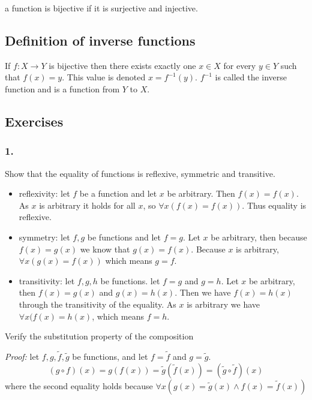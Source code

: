 a function is bijective if it is surjective and injective.

\subsection{Definition of inverse functions}

If $f:X\rightarrow Y$ is bijective then there exists exactly one $x\in X$ for every $y\in Y$ such that $f(x) = y$. This value is denoted $x = f^{-1}(y)$. $f^{-1}$ is called the inverse function and is a function from $Y$ to $X$.


\subsection{Exercises}

\subsubsection*{1.} Show that the equality of functions is reflexive, symmetric and transitive.
\begin{itemize}
	\item reflexivity: let $f$ be a function and let $x$ be arbitrary. Then $f(x) = f(x)$. As $x$ is arbitrary it holds for all $x$, so $\forall x (f(x) = f(x))$. Thus equality is reflexive.
	\item symmetry: let $f,g$ be functions and let $f=g$. Let $x$ be arbitrary, then because $f(x) = g(x)$ we know that $g(x)=f(x)$. Because $x$ is arbitrary, $\forall x(g(x) = f(x))$ which means $g=f$.
	\item transitivity: let $f,g,h$ be functions. let $f=g$ and $g=h$. Let $x$ be arbitrary, then $f(x) = g(x)$ and $g(x) = h(x)$. Then we have $f(x) = h(x)$ through the transitivity of the equality. As $x$ is arbitrary we have $\forall x(f(x) = h(x)$, which means $f=h$.
\end{itemize}
Verify the substitution property of the composition

\textit{Proof: } let $f,g,\tilde f,\tilde g$ be functions, and let $f=\tilde f$ and $g=\tilde g$.
$$
(g\circ f)(x) = g(f(x)) = \tilde g(\tilde f(x)) = (\tilde g\circ\tilde f)(x)
$$
where the second equality holds because $\forall x (g(x)=\tilde g(x) \wedge f(x)=\tilde f(x))$

